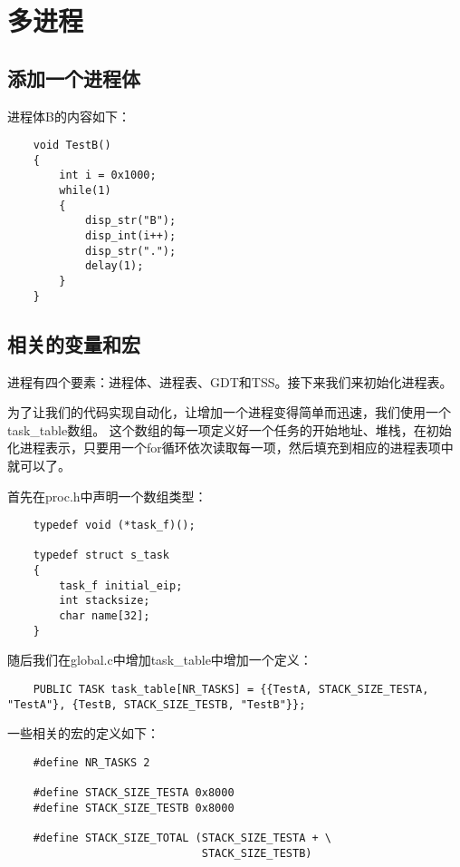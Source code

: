 \documentclass[a4paper,left=2.5cm,right=2.5cm,11pt]{report}
\begin{document}
\section{多进程}
\subsection{添加一个进程体}
	进程体B的内容如下：
	\begin{lstlisting}
	void TestB()
	{
		int i = 0x1000;
		while(1)
		{
			disp_str("B");
			disp_int(i++);
			disp_str(".");
			delay(1);
		}
	}
	\end{lstlisting}

\subsection{相关的变量和宏}
	进程有四个要素：进程体、进程表、GDT和TSS。接下来我们来初始化进程表。\par

	为了让我们的代码实现自动化，让增加一个进程变得简单而迅速，我们使用一个task\_table数组。
	这个数组的每一项定义好一个任务的开始地址、堆栈，在初始化进程表示，只要用一个for循环依次读取每一项，然后填充到相应的进程表项中就可以了。\par

	首先在proc.h中声明一个数组类型：
	\begin{lstlisting}
	typedef void (*task_f)();

	typedef struct s_task
	{
		task_f initial_eip;
		int stacksize;
		char name[32];
	}
	\end{lstlisting}

	随后我们在global.c中增加task\_table中增加一个定义：
	\begin{lstlisting}
	PUBLIC TASK task_table[NR_TASKS] = {{TestA, STACK_SIZE_TESTA, "TestA"}, {TestB, STACK_SIZE_TESTB, "TestB"}};
	\end{lstlisting}

	一些相关的宏的定义如下：
	\begin{lstlisting}
	#define NR_TASKS 2

	#define STACK_SIZE_TESTA 0x8000
	#define STACK_SIZE_TESTB 0x8000

	#define STACK_SIZE_TOTAL (STACK_SIZE_TESTA + \
							  STACK_SIZE_TESTB)
	\end{lstlisting}
\end{document}

